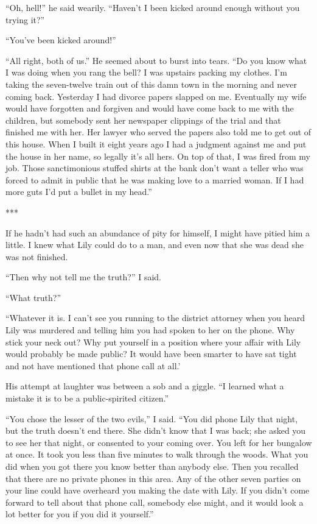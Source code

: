 \documentclass{novel}
\begin{document}
{“Oh, hell!” he said wearily. “Haven’t I been kicked around enough without you trying it?”

“You’ve been kicked around!”

“All right, both of us.” He seemed about to burst into tears. “Do you know what I was doing when you rang the bell? I was upstairs packing my clothes. I’m taking the seven-twelve train out of this damn town in the morning and never coming back. Yesterday I had divorce papers slapped on me. Eventually my wife would have forgotten and forgiven and would have come back to me with the children, but somebody sent her newspaper clippings of the trial and that finished me with her. Her lawyer who served the papers also told me to get out of this house. When I built it eight years ago I had a judgment against me and put the house in her name, so legally it’s all hers. On top of that, I was fired from my job. Those sanctimonious stuffed shirts at the bank don’t want a teller who was forced to admit in public that he was making love to a married woman. If I had more guts I’d put a bullet in my head.”

***

If he hadn’t had such an abundance of pity for himself, I might have pitied him a little. I knew what Lily could do to a man, and even now that she was dead she was not finished.

“Then why not tell me the truth?” I said.

“What truth?”

“Whatever it is. I can’t see you running to the district attorney when you heard Lily was murdered and telling him you had spoken to her on the phone. Why stick your neck out? Why put yourself in a position where your affair with Lily would probably be made public? It would have been smarter to have sat tight and not have mentioned that phone call at all.’

His attempt at laughter was between a sob and a giggle. “I learned what a mistake it is to be a public-spirited citizen.”

“You chose the lesser of the two evils,” I said. “You did phone Lily that night, but the truth doesn’t end there. She didn’t know that I was back; she asked you to see her that night, or consented to your coming over. You left for her bungalow at once. It took you less than five minutes to walk through the woods. What you did when you got there you know better than anybody else. Then you recalled that there are no private phones in this area. Any of the other seven parties on your line could have overheard you making the date with Lily. If you didn’t come forward to tell about that phone call, somebody else might, and it would look a lot better for you if you did it yourself.”

}
\end{document}
